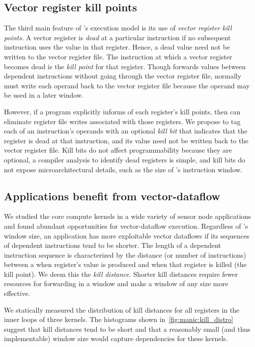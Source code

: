 \subsection{Vector register kill points}

The third main feature of \manic's execution model is its use of {\em vector
register kill points}.  A vector register is {\em dead} at a particular
instruction if no subsequent instruction uses the value in that register.
Hence, a dead value need not be written to the vector register file.
%
The instruction at which a vector register becomes dead is the {\em kill point}
for that register.
%
Though \manic forwards values between dependent instructions without
going through the vector register file,
\manic normally must write each operand back
to the vector register file because the operand may be
used in a later window.

However, if a program explicitly informs \manic of each register's kill
points, then \manic can eliminate register file writes associated with those
registers. We propose to tag each of an instruction's operands  with an
optional {\em kill bit} that indicates that the register
is dead at that instruction, and its value need not be written back to the
vector register file.  Kill bits do
not affect programmability because they are optional, a compiler analysis to
identify dead registers is simple, and kill bits do not expose 
microarchitectural details, such as the size of \manic's instruction
window. 
%

\subsection{Applications benefit from vector-dataflow}
We studied the core compute kernels in a wide variety of sensor
node applications and found abundant opportunities for vector-dataflow execution.
%
Regardless of \manic's window size, an application has more exploitable vector
dataflows if its sequences of dependent instructions tend to be shorter.
%
The length of a dependent instruction sequence is characterized by the distance (or number of instructions) between a when register's value is produced and when that register is killed (the kill point).
%
We deem this the \emph{kill distance}.
%
Shorter kill distances require fewer
resources for forwarding in a window and make a window of any size more effective.
%

\figMANICKillDistro

We statically measured the distribution of kill distances for all registers in the
inner loops of three kernels. 
% 
The histograms shown in~\autoref{fig:manic:kill_distro} suggest that kill distances tend to be short and that a reasonably small (and thus implementable) window size would capture dependencies for these kernels.

